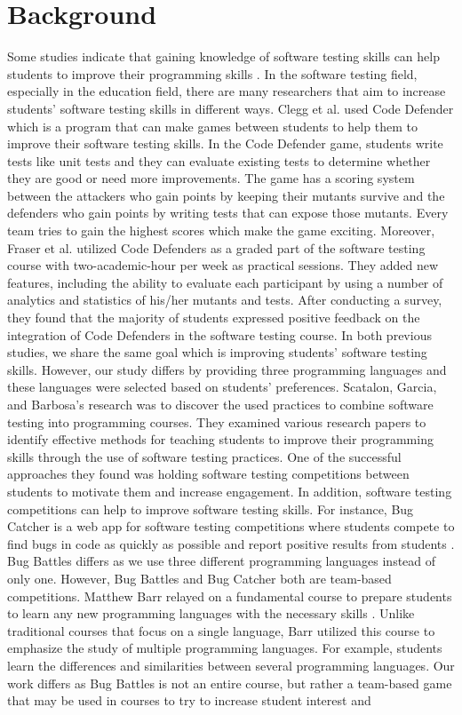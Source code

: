 \documentclass{article}
\begin{document}
\section{Background} \label{section:background}
Some studies indicate that gaining knowledge of software testing skills can help students to improve their programming skills \cite{10.5555/2459936.2459950}. In the software testing field, especially in the education field, there are many researchers that aim to increase students' software testing skills in different ways. Clegg et al. \cite{clegg2017teaching} used Code Defender which is a program that can make games between students to help them to improve their software testing skills. In the Code Defender game, students write tests like unit tests and they can evaluate existing tests to determine whether they are good or need more improvements. The game has a scoring system between the attackers who gain points by keeping their mutants survive and the defenders who gain points by writing tests that can expose those mutants. Every team tries to gain the highest scores which make the game exciting. Moreover, Fraser et al. \cite{fraser2020teaching} utilized Code Defenders as a graded part of the software testing course with two-academic-hour per week as practical sessions. They added new features, including the ability to evaluate each participant by using a number of analytics and statistics of his/her mutants and tests. After conducting a survey, they found that the majority of students expressed positive feedback on the integration of Code Defenders in the software testing course. In both previous studies, we share the same goal which is improving students' software testing skills. However, our study differs by providing three programming languages and these languages were selected based on students' preferences. Scatalon, Garcia, and Barbosa's research \cite{9274256} was to discover the used practices to combine software testing into programming courses. They examined various research papers to identify effective methods for teaching students to improve their programming skills through the use of software testing practices. One of the successful approaches they found was holding software testing competitions between students to motivate them and increase engagement. In addition, software testing competitions can help to improve software testing skills. For instance, Bug Catcher is a web app for software testing competitions where students compete to find bugs in code as quickly as possible and report positive results from students \cite{bryce2013bug}. Bug Battles differs as we use three different programming languages instead of only one. However, Bug Battles and Bug Catcher both are team-based competitions. Matthew Barr relayed on a fundamental course to prepare students to learn any new programming languages with the necessary skills \cite{barr2023learn}. Unlike traditional courses that focus on a single language, Barr utilized this course to emphasize the study of multiple programming languages. For example, students learn the differences and similarities between several programming languages. Our work differs as Bug Battles is not an entire course, but rather a team-based game that may be used in courses to try to increase student interest and 
\end{document}
